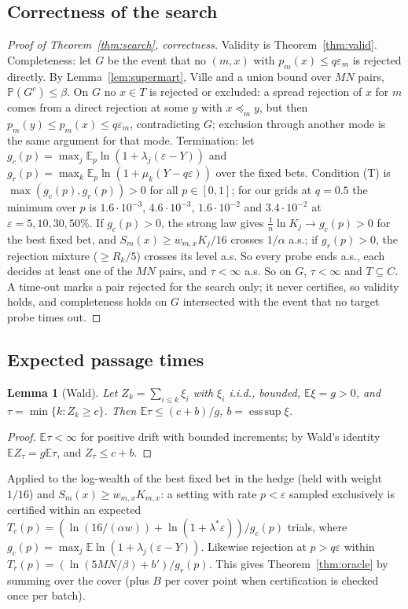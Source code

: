 \documentclass{article}
\newtheorem{lemma}{Lemma}
\newcommand{\eps}{\varepsilon}
\newcommand{\preceqm}{\preceq_m}
\newcommand{\E}{\mathbb{E}}
\renewcommand{\P}{\mathbb{P}}
\begin{document}
\subsection{Correctness of the search}
\begin{proof}[Proof of Theorem~\ref{thm:search}, correctness]
Validity is Theorem~\ref{thm:valid}. Completeness: let $G$ be the event
that no $(m,x)$ with $p_m(x)\le q\eps_m$ is rejected directly. By
Lemma~\ref{lem:supermart}, Ville and a union bound over $MN$ pairs,
$\P(G^c)\le\beta$. On $G$ no $x\in T$ is rejected or excluded: a spread
rejection of $x$ for $m$ comes from a direct rejection at some $y$ with
$x\preceqm y$, but then $p_m(y)\le p_m(x)\le q\eps_m$, contradicting $G$;
exclusion through another mode is the same argument for that mode.
Termination: let $g_c(p)=\max_j\E_p\ln(1+\lambda_j(\eps-Y))$ and
$g_r(p)=\max_k\E_p\ln(1+\mu_k(Y-q\eps))$ over the fixed bets. Condition
(T) is $\max(g_c(p),g_r(p))>0$ for all $p\in[0,1]$; for our grids at $q=0.5$
the minimum over $p$ is $1.6\cdot10^{-3}$, $4.6\cdot10^{-3}$,
$1.6\cdot10^{-2}$ and $3.4\cdot10^{-2}$ at $\eps=5,10,30,50\%$. If
$g_c(p)>0$, the strong law gives $\tfrac1n\ln K_j\to g_c(p)>0$ for the best
fixed bet, and $S_m(x)\ge w_{m,x}K_j/16$ crosses $1/\alpha$ a.s.; if
$g_r(p)>0$, the rejection mixture ($\ge R_k/5$) crosses its level a.s. So
every probe ends a.s., each decides at least one of the $MN$ pairs, and
$\tau<\infty$ a.s. So on $G$, $\tau<\infty$ and $T\subseteq C$. A
time-out marks a pair rejected for the search only; it never certifies,
so validity holds, and completeness holds on $G$ intersected with the
event that no target probe times out.
\end{proof}

\subsection{Expected passage times}
\begin{lemma}[Wald]\label{lem:wald}
Let $Z_k=\sum_{i\le k}\xi_i$ with $\xi_i$ i.i.d., bounded, $\E\xi=g>0$, and
$\tau=\min\{k:Z_k\ge c\}$. Then $\E\tau\le(c+b)/g$, $b=\operatorname{ess\,sup}\xi$.
\end{lemma}
\begin{proof}
$\E\tau<\infty$ for positive drift with bounded increments; by Wald's
identity $\E Z_\tau=g\E\tau$, and $Z_\tau\le c+b$.
\end{proof}
Applied to the log-wealth of the best fixed bet in the hedge (held with
weight $1/16$) and $S_m(x)\ge w_{m,x}K_{m,x}$: a setting with rate $p<\eps$
sampled exclusively is certified within an expected
$T_c(p)=(\ln(16/(\alpha w))+\ln(1+\lambda^*\eps))/g_c(p)$ trials, where
$g_c(p)=\max_j\E\ln(1+\lambda_j(\eps-Y))$. Likewise rejection at $p>q\eps$
within $T_r(p)=(\ln(5MN/\beta)+b')/g_r(p)$. This gives
Theorem~\ref{thm:oracle} by summing over the cover (plus $B$ per cover
point when certification is checked once per batch).
\end{document}
